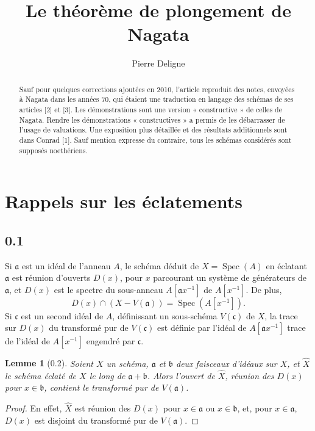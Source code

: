 \documentclass[11pt]{article}
\title{Le théorème de plongement de Nagata}
\author{Pierre Deligne}
\date{}
\newtheorem*{lemma}{Lemme}
\newcommand{\Spec}{\operatorname{Spec}}
\newcommand{\wh}[1]{\widehat{#1}}
\begin{document}
\maketitle

\begin{abstract}
Sauf pour quelques corrections ajoutées en 2010, l'article reproduit des notes, envoyées à Nagata dans les années 70, qui étaient une traduction en langage des schémas de ses articles [2] et [3]. Les démonstrations sont une version « constructive » de celles de Nagata. Rendre les démonstrations « constructives » a permis de les débarrasser de l'usage de valuations. Une exposition plus détaillée et des résultats additionnels sont dans Conrad [1]. Sauf mention expresse du contraire, tous les schémas considérés sont supposés noethériens.
\end{abstract}

\section{Rappels sur les éclatements}

\subsection*{0.1}
Si \(\mathfrak a\) est un idéal de l'anneau \(A\), le schéma déduit de \(X=\Spec(A)\) en éclatant \(\mathfrak a\) est réunion d'ouverts \(D(x)\), pour \(x\) parcourant un système de générateurs de \(\mathfrak a\), et \(D(x)\) est le spectre du sous-anneau \(A[\mathfrak a x^{-1}]\) de \(A[x^{-1}]\). De plus,
\[
D(x)\cap (X-V(\mathfrak a))=\Spec(A[x^{-1}]).
\]
Si \(\mathfrak c\) est un second idéal de \(A\), définissant un sous-schéma \(V(\mathfrak c)\) de \(X\), la trace sur \(D(x)\) du transformé pur de \(V(\mathfrak c)\) est définie par l'idéal de \(A[\mathfrak a x^{-1}]\) trace de l'idéal de \(A[x^{-1}]\) engendré par \(\mathfrak c\).

\begin{lemma}[0.2]
Soient \(X\) un schéma, \(\mathfrak a\) et \(\mathfrak b\) deux faisceaux d'idéaux sur \(X\), et \(\wh X\) le schéma éclaté de \(X\) le long de \(\mathfrak a+\mathfrak b\). Alors l'ouvert de \(\wh X\), réunion des \(D(x)\) pour \(x\in\mathfrak b\), contient le transformé pur de \(V(\mathfrak a)\).
\end{lemma}

\begin{proof}
En effet, \(\wh X\) est réunion des \(D(x)\) pour \(x\in\mathfrak a\) ou \(x\in\mathfrak b\), et, pour \(x\in\mathfrak a\), \(D(x)\) est disjoint du transformé pur de \(V(\mathfrak a)\).
\end{proof}
\end{document}
